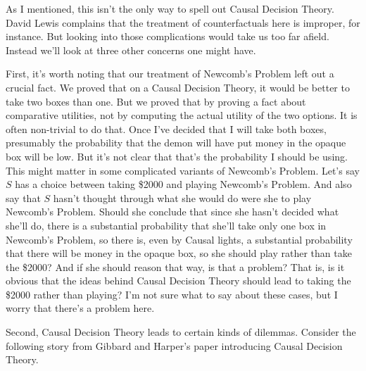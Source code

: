 As I mentioned, this isn't the only way to spell out Causal Decision Theory. David Lewis complains that the treatment of counterfactuals here is improper, for instance. But looking into those complications would take us too far afield. Instead we'll look at three other concerns one might have.

First, it's worth noting that our treatment of Newcomb's Problem left out a crucial fact. We proved that on a Causal Decision Theory, it would be better to take two boxes than one. But we proved that by proving a fact about comparative utilities, not by computing the actual utility of the two options. It is often non-trivial to do that. Once I've decided that I will take both boxes, presumably the probability that the demon will have put money in the opaque box will be low. But it's not clear that that's the probability I should be using. This might matter in some complicated variants of Newcomb's Problem. Let's say $S$ has a choice between taking \$2000 and playing Newcomb's Problem. And also say that $S$ hasn't thought through what she would do were she to play Newcomb's Problem. Should she conclude that since she hasn't decided what she'll do, there is a substantial probability that she'll take only one box in Newcomb's Problem, so there is, even by Causal lights, a substantial probability that there will be money in the opaque box, so she should play rather than take the \$2000? And if she should reason that way, is that a problem? That is, is it obvious that the ideas behind Causal Decision Theory should lead to taking the \$2000 rather than playing? I'm not sure what to say about these cases, but I worry that there's a problem here.

Second, Causal Decision Theory leads to certain kinds of dilemmas. Consider the following story from Gibbard and Harper's paper introducing Causal Decision Theory.

